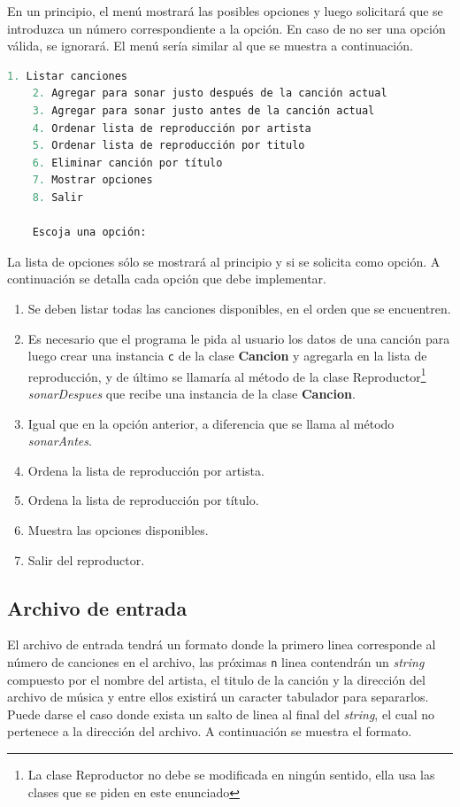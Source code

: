 \documentclass[10pt, letterpaper]{article}
\begin{document}
En un principio, el menú mostrará las posibles opciones y luego solicitará que se introduzca un número correspondiente a la opción. En caso de no ser una opción válida, se ignorará. El menú sería similar al que se muestra a continuación.

\begin{center}
\begin{lstlisting}[language=Python,frame=single]
    1. Listar canciones
    2. Agregar para sonar justo después de la canción actual 
    3. Agregar para sonar justo antes de la canción actual
    4. Ordenar lista de reproducción por artista
    5. Ordenar lista de reproducción por titulo
    6. Eliminar canción por título
    7. Mostrar opciones
    8. Salir
    
    Escoja una opción:
\end{lstlisting}
\end{center}

La lista de opciones sólo se mostrará al principio y si se solicita como opción. A continuación se detalla cada opción que debe implementar.

\begin{enumerate}
    \item Se deben listar todas las canciones disponibles, en el orden que se encuentren.
    \item Es necesario que el programa le pida al usuario los datos de una canción para luego crear una instancia \texttt{c} de la clase \textbf{Cancion} y agregarla en la lista de reproducción, y de último se llamaría al método de la clase Reproductor\footnote{La clase Reproductor no debe se modificada en ningún sentido, ella usa las clases que se piden en este enunciado} \textit{sonarDespues} que recibe una instancia de la clase \textbf{Cancion}.
    \item Igual que en la opción anterior, a diferencia que se llama al método \textit{sonarAntes}.
    \item Ordena la lista de reproducción por artista.
    \item Ordena la lista de reproducción por título.
    \item Muestra las opciones disponibles.
    \item Salir del reproductor.
\end{enumerate}

\subsection*{Archivo de entrada}
El archivo de entrada tendrá un formato donde la primero linea corresponde al número de canciones en el archivo, las próximas \texttt{n} linea contendrán un \textit{string} compuesto por el nombre del artista, el titulo de la canción y la dirección del archivo de música y entre ellos existirá un caracter tabulador para separarlos. Puede darse el caso donde exista un salto de linea al final del \textit{string}, el cual no pertenece a la dirección del archivo. A continuación se muestra el formato.
\end{document}
